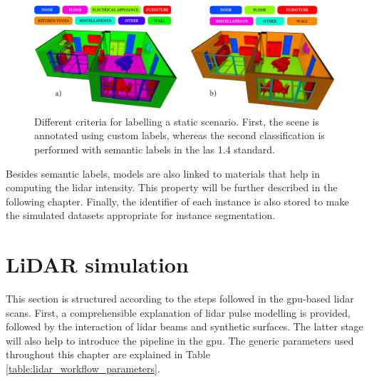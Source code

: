 \begin{figure}[ht]
    \centering
    \includegraphics[width=\linewidth]{figs/lidar_simulation/semantic_labels.png}
	\caption{Different criteria for labelling a static scenario. First, the scene is annotated using custom labels, whereas the second classification is performed with semantic labels in the \acrshort{las} 1.4 standard.}
	\label{fig:kitchen_classification}
\end{figure}

Besides semantic labels, models are also linked to materials that help in computing the \acrshort{lidar} intensity. This property will be further described in the following chapter. Finally, the identifier of each instance is also stored to make the simulated datasets appropriate for instance segmentation.

\section{LiDAR simulation}

This section is structured according to the steps followed in the \acrshort{gpu}-based \acrshort{lidar} scans. First, a comprehensible explanation of \acrshort{lidar} pulse modelling is provided, followed by the interaction of \acrshort{lidar} beams and synthetic surfaces. The latter stage will also help to introduce the pipeline in the \acrshort{gpu}. The generic parameters used throughout this chapter are explained in Table \ref{table:lidar_workflow_parameters}. 

